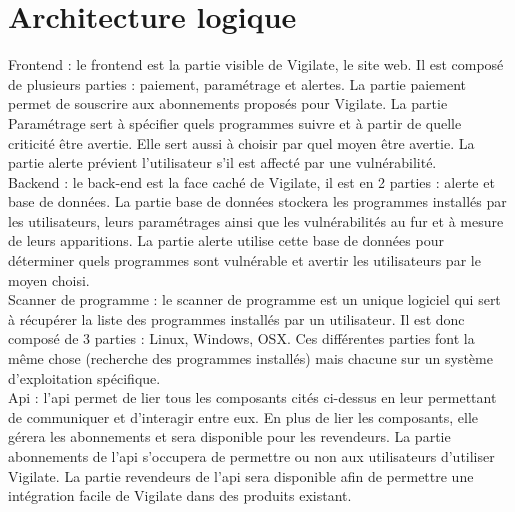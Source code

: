 \section{Architecture logique}
Frontend : le frontend est la partie visible de Vigilate, le site web.
Il est composé de plusieurs parties : paiement, paramétrage et alertes.
La partie paiement permet de souscrire aux abonnements proposés pour Vigilate.
La partie Paramétrage sert à spécifier quels programmes suivre et à partir de quelle criticité être avertie. Elle sert aussi à choisir par quel moyen être avertie.
La partie alerte prévient l'utilisateur s'il est affecté par une vulnérabilité.\\

Backend : le back-end est la face caché de Vigilate, il est en 2 parties : alerte et base de données.
La partie base de données stockera les programmes installés par les utilisateurs, leurs paramétrages ainsi que les vulnérabilités au fur et à mesure de leurs apparitions.
La partie alerte utilise cette base de données pour déterminer quels programmes sont vulnérable et avertir les utilisateurs par le moyen choisi. \\

Scanner de programme : le scanner de programme est un unique logiciel qui sert à récupérer la liste des programmes installés par un utilisateur. Il est donc composé de 3 parties : Linux, Windows, OSX.
Ces différentes parties font la même chose (recherche des programmes installés) mais chacune sur un système d'exploitation spécifique.\\

Api : l'api permet de lier tous les composants cités ci-dessus en leur permettant de communiquer et d'interagir entre eux. En plus de lier les composants, elle gérera les abonnements et sera disponible pour les revendeurs.
La partie abonnements de l'api s'occupera de permettre ou non aux utilisateurs d'utiliser Vigilate.
La partie revendeurs de l'api sera disponible afin de permettre une intégration facile de Vigilate dans des produits existant.
\newpage
